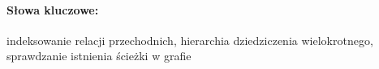 
\paragraph{Słowa kluczowe:} indeksowanie relacji przechodnich, hierarchia dziedziczenia wielokrotnego, sprawdzanie
istnienia ścieżki w grafie
